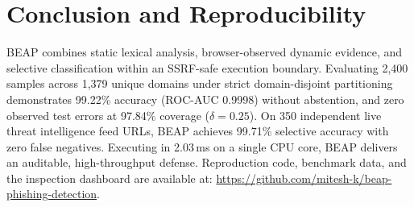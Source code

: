 \documentclass{llncs}
\begin{document}
\section{Conclusion and Reproducibility}

BEAP combines static lexical analysis, browser-observed dynamic evidence, and selective classification within an SSRF-safe execution boundary. Evaluating 2,400 samples across 1,379 unique domains under strict domain-disjoint partitioning demonstrates 99.22\% accuracy (ROC-AUC 0.9998) without abstention, and zero observed test errors at 97.84\% coverage ($\delta=0.25$). On 350 independent live threat intelligence feed URLs, BEAP achieves 99.71\% selective accuracy with zero false negatives. Executing in 2.03\,ms on a single CPU core, BEAP delivers an auditable, high-throughput defense. Reproduction code, benchmark data, and the inspection dashboard are available at: \url{https://github.com/mitesh-k/beap-phishing-detection}.
\end{document}
